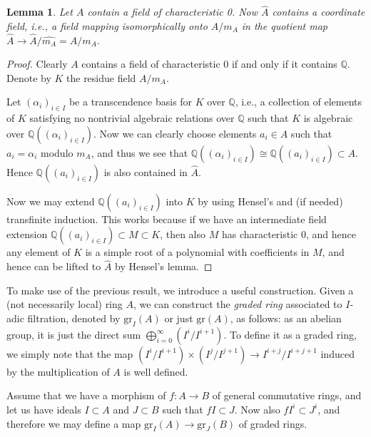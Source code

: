 \documentclass[12pt,a4paper,leqno]{article}
\newcommand{\Q}{\mathbb{Q}}
\newcommand{\gr}{\mathrm{gr}}
\theoremstyle{plain}
\newtheorem{lem}[theo]{Lemma}
\theoremstyle{definition}
\theoremstyle{remark}
\begin{document}
\begin{lem}
Let $A$ contain a field of characteristic 0. Now $\widehat A$ contains a coordinate field, i.e., a field mapping isomorphically onto $ A/ m_A$ in the quotient map $\widehat A \to \widehat A/ \widehat {m_A} = A / m_A$.
\end{lem}
\begin{proof}
Clearly $A$ contains a field of characteristic 0 if and only if it contains $\Q$. Denote by $K$ the residue field $A/m_A$. 

Let $(\alpha_i)_{i \in I}$ be a transcendence basis for $K$ over $\Q$, i.e., a collection of elements of $K$ satisfying no nontrivial algebraic relations over $\Q$ such that $K$ is algebraic over $\Q((\alpha_i)_{i \in I})$. Now we can clearly choose elements $a_i \in A$ such that $a_i = \alpha_i$ modulo $m_A$, and thus we see that $\Q((\alpha_i)_{i \in I}) \cong \Q((a_i)_{i \in I}) \subset A$. Hence $\Q((a_i)_{i \in I})$ is also contained in $\widehat A$.

Now we may extend $\Q((a_i)_{i \in I})$ into $K$ by using Hensel's and (if needed) transfinite induction. This works because if we have an intermediate field extension $\Q((a_i)_{i \in I}) \subset M \subset K$, then also $M$ has characteristic $0$, and hence any element of $K$ is a simple root of a polynomial with coefficients in $M$, and hence can be lifted to $\widehat A$ by Hensel's lemma.
\end{proof}

To make use of the previous result, we introduce a useful construction. Given a (not necessarily local) ring $A$, we can construct the \emph{graded ring} associated to $I$-adic filtration, denoted by $\gr_I (A)$ or just $\gr (A)$, as follows: as an abelian group, it is just the direct sum $\bigoplus_{i=0}^\infty (I^i / I^{i+1})$. To define it as a graded ring, we simply note that the map $(I^i / I^{i+1}) \times (I^j / I^{j+1}) \to I^{i+j} / I^{i+j+1}$ induced by the multiplication of $A$ is well defined. 

Assume that we have a morphism of $f: A \to B$ of general commutative rings, and let us have ideals $I \subset A$ and $J \subset B$ such that $fI \subset J$. Now also $fI^i \subset J^i$, and therefore we may define a map $\gr_I (A) \to \gr_J (B)$ of graded rings.
\end{document}
